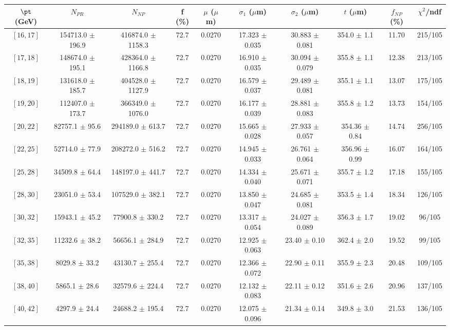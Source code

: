 \begin{tabular}{c||c|c|c|c|c|c|c||c|c}
$\pt$ (GeV) & $N_{PR}$ & $N_{NP}$ & f (\%) & $\mu$ ($\mu$m) & $\sigma_1$ ($\mu$m) & $\sigma_2$ ($\mu$m)  & $t$ ($\mu$m) & $f_{NP}$ (\%) & $\chi^2$/ndf \\
\hline
$[16, 17]$ & 154713.0 $\pm$ 196.9 & 416874.0 $\pm$ 1158.3 & 72.7 & 0.0270 & 17.323 $\pm$ 0.035 & 30.883 $\pm$ 0.081 & 354.0 $\pm$ 1.1 & 11.70 & 215/105\\
$[17, 18]$ & 148674.0 $\pm$ 195.1 & 428364.0 $\pm$ 1166.8 & 72.7 & 0.0270 & 16.910 $\pm$ 0.035 & 30.094 $\pm$ 0.079 & 355.8 $\pm$ 1.1 & 12.38 & 213/105\\
$[18, 19]$ & 131618.0 $\pm$ 185.7 & 404528.0 $\pm$ 1127.9 & 72.7 & 0.0270 & 16.579 $\pm$ 0.037 & 29.489 $\pm$ 0.081 & 355.1 $\pm$ 1.1 & 13.07 & 175/105\\
$[19, 20]$ & 112407.0 $\pm$ 173.7 & 366349.0 $\pm$ 1076.0 & 72.7 & 0.0270 & 16.177 $\pm$ 0.039 & 28.881 $\pm$ 0.083 & 355.8 $\pm$ 1.2 & 13.73 & 154/105\\
$[20, 22]$ & 82757.1 $\pm$ 95.6 & 294189.0 $\pm$ 613.7 & 72.7 & 0.0270 & 15.665 $\pm$ 0.028 & 27.933 $\pm$ 0.057 & 354.36 $\pm$ 0.84 & 14.74 & 256/105\\
$[22, 25]$ & 52714.0 $\pm$ 77.9 & 208272.0 $\pm$ 516.2 & 72.7 & 0.0270 & 14.945 $\pm$ 0.033 & 26.761 $\pm$ 0.064 & 356.96 $\pm$ 0.99 & 16.07 & 164/105\\
$[25, 28]$ & 34509.8 $\pm$ 64.4 & 148197.0 $\pm$ 441.7 & 72.7 & 0.0270 & 14.334 $\pm$ 0.040 & 25.671 $\pm$ 0.071 & 355.7 $\pm$ 1.2 & 17.18 & 155/105\\
$[28, 30]$ & 23051.0 $\pm$ 53.4 & 107529.0 $\pm$ 382.1 & 72.7 & 0.0270 & 13.850 $\pm$ 0.047 & 24.685 $\pm$ 0.081 & 353.5 $\pm$ 1.4 & 18.34 & 126/105\\
$[30, 32]$ & 15943.1 $\pm$ 45.2 & 77900.8 $\pm$ 330.2 & 72.7 & 0.0270 & 13.317 $\pm$ 0.054 & 24.027 $\pm$ 0.089 & 356.3 $\pm$ 1.7 & 19.02 & 96/105\\
$[32, 35]$ & 11232.6 $\pm$ 38.2 & 56656.1 $\pm$ 284.9 & 72.7 & 0.0270 & 12.925 $\pm$ 0.063 & 23.40 $\pm$ 0.10 & 362.4 $\pm$ 2.0 & 19.52 & 99/105\\
$[35, 38]$ & 8029.8 $\pm$ 33.2 & 43130.7 $\pm$ 255.4 & 72.7 & 0.0270 & 12.366 $\pm$ 0.072 & 22.90 $\pm$ 0.11 & 355.9 $\pm$ 2.3 & 20.48 & 109/105\\
$[38, 40]$ & 5865.1 $\pm$ 28.6 & 32579.6 $\pm$ 224.4 & 72.7 & 0.0270 & 12.132 $\pm$ 0.083 & 22.11 $\pm$ 0.12 & 351.6 $\pm$ 2.6 & 20.96 & 137/105\\
$[40, 42]$ & 4297.9 $\pm$ 24.4 & 24688.2 $\pm$ 195.4 & 72.7 & 0.0270 & 12.075 $\pm$ 0.096 & 21.34 $\pm$ 0.14 & 349.8 $\pm$ 3.0 & 21.53 & 136/105\\

\end{tabular}

